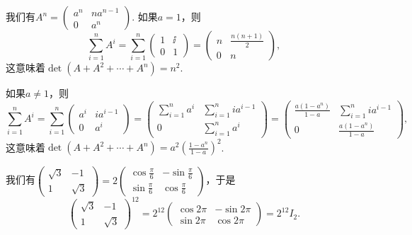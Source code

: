 \begin{solution}
  我们有$A^n=\begin{pmatrix}
    a^n & na^{n-1} \\
    0 & a^n
  \end{pmatrix}$. 如果$a=1$，则
  \[
    \sum_{i=1}^nA^i = \sum_{i=1}^n\begin{pmatrix}
      1 & \ii \\
      0 & 1
    \end{pmatrix} = \begin{pmatrix}
      n & \frac{n(n+1)}2 \\
      0 & n
    \end{pmatrix},
  \]
  这意味着$\det(A+A^2+\cdots+A^n)=n^2$.

  如果$a\ne1$，则
  \[
    \sum_{i=1}^nA^i = \sum_{i=1}^n \begin{pmatrix}
      a^i & ia^{i-1} \\
      0 & a^i
    \end{pmatrix} = \begin{pmatrix}
      \sum_{i=1}^na^i & \sum_{i=1}^nia^{i-1} \\
      0 & \sum_{i=1}^na^i
    \end{pmatrix} = \begin{pmatrix}
      \frac{a(1-a^n)}{1-a} & \sum_{i=1}^nia^{i-1} \\
      0 & \frac{a(1-a^n)}{1-a}
    \end{pmatrix},
  \]
  这意味着$\det(A+A^2+\cdots+A^n)=a^2\left(
  \frac{1-a^n}{1-a}\right)^2$.
\end{solution}

\begin{solution}
  我们有$\begin{pmatrix}
    \sqrt3 & -1 \\
    1 & \sqrt3
  \end{pmatrix}=2\begin{pmatrix}
    \cos\frac\pi6 & - \sin\frac\pi6 \\
    \sin\frac\pi6 & \cos\frac\pi6
  \end{pmatrix}$，于是
  \[
    \begin{pmatrix}
    \sqrt3 & -1 \\
    1 & \sqrt3
  \end{pmatrix}^{12} = 2^{12}
  \begin{pmatrix}
    \cos2\pi & - \sin 2\pi \\
    \sin2\pi & \cos 2\pi
  \end{pmatrix} = 2^{12}I_2.
  \]
\end{solution}

